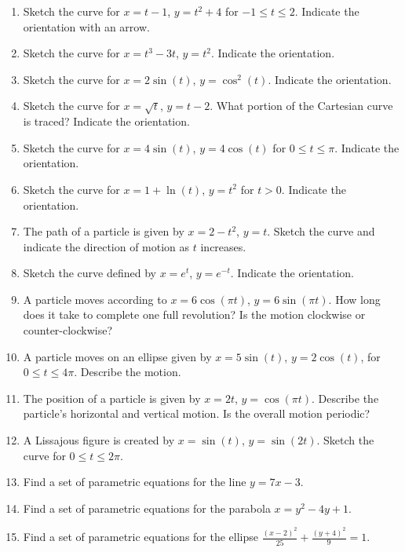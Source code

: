 \documentclass{article}
\begin{document}
\begin{enumerate}
    \item Sketch the curve for $x = t-1$, $y = t^2+4$ for $-1 \le t \le 2$. Indicate the orientation with an arrow.
    \item Sketch the curve for $x = t^3 - 3t$, $y = t^2$. Indicate the orientation.
    \item Sketch the curve for $x = 2\sin(t)$, $y = \cos^2(t)$. Indicate the orientation.
    \item Sketch the curve for $x = \sqrt{t}$, $y = t - 2$. What portion of the Cartesian curve is traced? Indicate the orientation.
    \item Sketch the curve for $x = 4\sin(t)$, $y = 4\cos(t)$ for $0 \le t \le \pi$. Indicate the orientation.
    \item Sketch the curve for $x = 1 + \ln(t)$, $y = t^2$ for $t > 0$. Indicate the orientation.
    \item The path of a particle is given by $x=2-t^2$, $y=t$. Sketch the curve and indicate the direction of motion as $t$ increases.
    \item Sketch the curve defined by $x = e^t$, $y = e^{-t}$. Indicate the orientation.

    \item A particle moves according to $x = 6\cos(\pi t)$, $y = 6\sin(\pi t)$. How long does it take to complete one full revolution? Is the motion clockwise or counter-clockwise?
    \item A particle moves on an ellipse given by $x = 5\sin(t)$, $y = 2\cos(t)$, for $0 \le t \le 4\pi$. Describe the motion.
    \item The position of a particle is given by $x = 2t$, $y = \cos(\pi t)$. Describe the particle's horizontal and vertical motion. Is the overall motion periodic?
    \item A Lissajous figure is created by $x = \sin(t)$, $y = \sin(2t)$. Sketch the curve for $0 \le t \le 2\pi$.

    \item Find a set of parametric equations for the line $y = 7x - 3$.
    \item Find a set of parametric equations for the parabola $x = y^2 - 4y + 1$.
    \item Find a set of parametric equations for the ellipse $\frac{(x-2)^2}{25} + \frac{(y+4)^2}{9} = 1$.


\end{enumerate}
\end{document}
